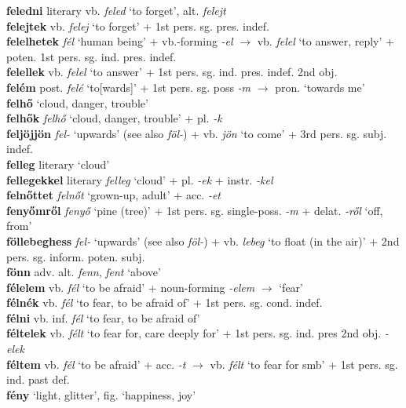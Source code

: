 \documentclass[11pt]{article}
\begin{document}
\textbf{feledni} literary vb. \emph{feled} `to forget',
alt. \emph{felejt} \\
\textbf{felejtek} vb. \emph{felej} `to forget' + 1st pers. sg. pres. indef. \\
\textbf{felelhetek} \emph{fél} `human being' + vb.-forming \emph{-el}
$\rightarrow$ vb. \emph{felel} `to answer, reply' + poten. 1st
pers. sg. ind. pres. indef. \\
\textbf{felellek} vb. \emph{felel} `to answer' + 1st
pers. sg. ind. pres. indef. 2nd obj. \\
\textbf{felém} post. \emph{felé} `to[wards]' + 1st
pers. sg. poss \emph{-m} $\rightarrow$ pron. `towards me' \\
\textbf{felhő} `cloud, danger, trouble' \\
\textbf{felhők} \emph{felhő} `cloud, danger, trouble' +
pl. \emph{-k} \\
\textbf{feljöjjön} \emph{fel-} `upwards' (see
also \emph{föl-}) + vb. \emph{jön} `to come' + 3rd
pers. sg. subj. indef. \\
\textbf{felleg} literary `cloud' \\
\textbf{fellegekkel} literary \emph{felleg} `cloud' + pl. \emph{-ek} +
instr. \emph{-kel} \\
\textbf{felnőttet} \emph{felnőt} `grown-up, adult' + acc. \emph{-et} \\
\textbf{fenyőmről} \emph{fenyő} `pine (tree)' + 1st pers. sg. single\hyp{}poss. \emph{-m} +
delat. \emph{-ről} `off, from' \\
\textbf{föllebeghess} \emph{fel-} `upwards' (see
also \emph{föl-}) + vb. \emph{lebeg} `to float (in the air)' + 2nd
pers. sg. inform. poten. subj. \\
\textbf{fönn} adv. alt. \emph{fenn}, \emph{fent} `above' \\
\textbf{félelem} vb. \emph{fél} `to be afraid' +
noun\hyp{}forming \emph{-elem} $\rightarrow$ `fear' \\
\textbf{félnék} vb. \emph{fél} `to fear, to be afraid of' + 1st
pers. sg. cond. indef. \\
\textbf{félni} vb. inf. \emph{fél} `to fear, to be afraid of' \\
\textbf{féltelek} vb. \emph{félt} `to fear for, care deeply for' +  1st pers. sg. ind. pres 2nd obj. \emph{-elek} \\
\textbf{féltem} vb. \emph{fél} `to be afraid' + acc. \emph{-t}
$\rightarrow$ vb. \emph{félt} `to fear for smb' + 1st
pers. sg. ind. past def. \\
\textbf{fény} `light,  glitter', fig. `happiness, joy' \\
\end{document}
